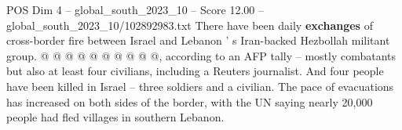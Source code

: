\begin{textsample}{POS Dim 4 – global\_south\_2023\_10 – Score 12.00 – global\_south\_2023\_10/102892983.txt}
There have been daily \textbf{exchanges} of cross-border fire between Israel and Lebanon ' s Iran-backed Hezbollah militant group. @ @ @ @ @ @ @ @ @ @, according to an AFP tally -- mostly combatants but also at least four civilians, including a Reuters journalist.
And four people have been killed in Israel -- three soldiers and a civilian.
The pace of evacuations has increased on both sides of the border, with the UN saying nearly 20,000 people had fled villages in southern Lebanon.

\end{textsample}
